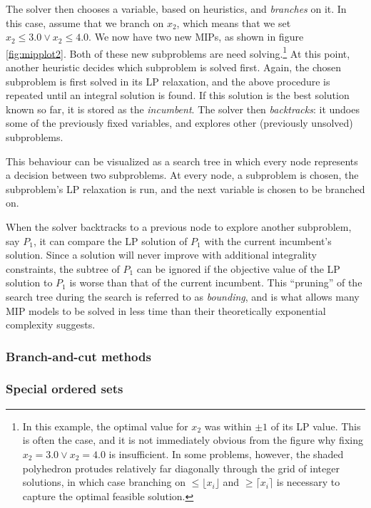 \documentclass[13pt, letterpaper, oneside]{book}
\begin{document}
The solver then chooses a variable, based on heuristics, and \textit{branches}
on it. In this case, assume that we branch on $x_2$, which means that we set
$x_2 \leq 3.0 \lor x_2 \leq 4.0$. We now have two new MIPs, as shown in figure
\ref{fig:mipplot2}. Both of these new subproblems are need solving.\footnote{In
this example, the optimal value for $x_2$ was
within $\pm1$ of its LP value.  This is often the case, and it is not
immediately obvious from the figure why fixing $x_2 = 3.0 \lor x_2 = 4.0$ is
insufficient. In some problems, however, the shaded polyhedron protudes
relatively far diagonally through the grid of integer solutions, in which case
branching on $\leq \lfloor x_i \rfloor$ and $\geq \lceil x_i \rceil$ is
necessary to capture the optimal feasible solution.} At
this point, another heuristic decides which subproblem is solved first.
Again, the chosen subproblem is first solved in its LP relaxation, and the above
procedure is repeated until an integral solution is found. If this solution is
the best solution known so far, it is stored as the \textit{incumbent}. The
solver then \textit{backtracks}: it undoes some of the previously fixed variables,
and explores other (previously unsolved) subproblems.

This behaviour can be visualized as a search tree in which every node represents
a decision between two subproblems. At every node, a subproblem is chosen, the
subproblem's LP relaxation is run, and the next variable is chosen to be
branched on.

When the solver backtracks to a previous node to explore another subproblem, say
$P_1$, it can compare the LP solution of $P_1$ with the current incumbent's
solution. Since a solution will never improve with additional integrality
constraints, the subtree of $P_1$ can be ignored if the objective value of the
LP solution to $P_1$ is worse than that of the current incumbent. This
``pruning'' of the search tree during the search is referred to as
\textit{bounding}, and is what allows many MIP models to be solved in less time than
their theoretically exponential complexity suggests.

\subsubsection{Branch-and-cut methods}

\subsubsection{Special ordered sets}
\end{document}
